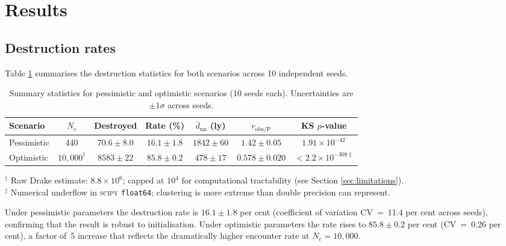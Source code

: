 \documentclass[useAMS,usenatbib]{mn2e}
\begin{document}
\section{Results}
\label{sec:results}

\subsection{Destruction rates}
\label{sec:destruction}

Table \ref{tab:results} summarises the destruction statistics for
both scenarios across 10 independent seeds.

\begin{table}
  \centering
  \caption{Summary statistics for pessimistic and optimistic scenarios
           (10 seeds each). Uncertainties are $\pm 1\sigma$ across seeds.}
  \label{tab:results}
  \begin{tabular}{lcccccc}
    \toprule
    Scenario & $N_c$ & Destroyed & Rate (\%) &
    $\bar{d}_\text{nn}$ (ly) & $r_\text{obs/P}$ & KS $p$-value \\
    \midrule
    Pessimistic & 440 & $70.6 \pm 8.0$ & $16.1 \pm 1.8$ &
    $1842 \pm 60$ & $1.42 \pm 0.05$ & $1.91\times10^{-42}$ \\
    Optimistic  & $10{,}000^\dagger$ & $8583 \pm 22$ & $85.8 \pm 0.2$ &
    $478 \pm 17$  & $0.578 \pm 0.020$ & $<2.2\times10^{-308\ddagger}$ \\
    \bottomrule
  \end{tabular}
  \begin{flushleft}
    \footnotesize
    $^\dagger$ Raw Drake estimate: $8.8\times10^6$; capped at $10^4$
    for computational tractability (see Section \ref{sec:limitations}).\\
    $^\ddagger$ Numerical underflow in \textsc{scipy} \texttt{float64};
    clustering is more extreme than double precision can represent.
  \end{flushleft}
\end{table}

Under pessimistic parameters the destruction rate is $16.1 \pm 1.8$
per cent (coefficient of variation CV~=~11.4 per cent across seeds),
confirming that the result is robust to initialisation.
Under optimistic parameters the rate rises to $85.8 \pm 0.2$ per cent
(CV~=~0.26 per cent), a factor of~5 increase that reflects the
dramatically higher encounter rate at $N_c = 10{,}000$.
\end{document}
